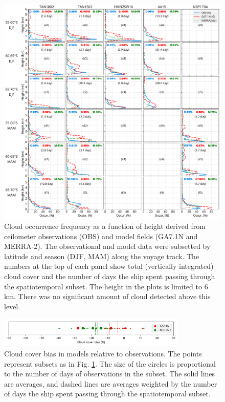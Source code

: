 \begin{figure}[p]
\centering
\includegraphics[width=\textwidth]{chapter2/fig/cloud_occurrence_panel_rev1.pdf}
\caption[Cloud occurrence frequency as a function of height derived from ceilometer
observations and model fields]{
Cloud occurrence frequency as a function of height derived from ceilometer
observations (OBS) and model fields (GA7.1N and MERRA-2). The observational and
model data were subsetted by latitude and season (DJF, MAM) along the voyage
track. The numbers at the top of each panel show total (vertically integrated)
cloud cover and the number of days the ship spent passing through the
spatiotemporal subset. The height in the plots is limited to 6 \unit{km}. There
was no significant amount of cloud detected above this level.
}
\label{fig:2:cloud-occurrence}
\end{figure}

\begin{figure}[p]
\centering
\includegraphics[width=0.8\textwidth]{chapter2/fig/cloud_cover_hist_rev1.pdf}
\caption[Cloud cover bias in models relative to observations]{
Cloud cover bias in models relative to observations. The points represent
subsets as in Fig. \ref{fig:2:cloud-occurrence}. The size of the circles is
proportional to the number of days of observations in the subset. The solid
lines are averages, and dashed lines are averages weighted by the number of days
the ship spent passing through the spatiotemporal subset.
}
\label{fig:2:cloud-cover-hist}
\end{figure}

